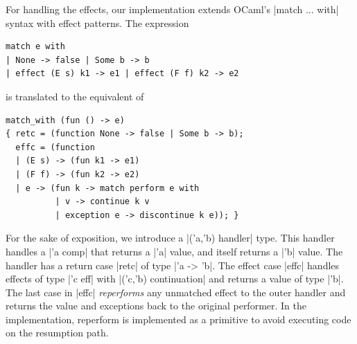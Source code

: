 \documentclass[sigplan,10pt,review,anonymous]{acmart}\settopmatter{printfolios=true,printccs=false,printacmref=false}
\begin{document}
For handling the effects, our implementation extends OCaml's |match ... with|
syntax with effect patterns. The expression
\begin{lstlisting}
match e with
| None -> false | Some b -> b
| effect (E s) k1 -> e1 | effect (F f) k2 -> e2
\end{lstlisting}
\noindent is translated to the equivalent of
\begin{lstlisting}
match_with (fun () -> e)
{ retc = (function None -> false | Some b -> b);
  effc = (function
  | (E s) -> (fun k1 -> e1)
  | (F f) -> (fun k2 -> e2)
  | e -> (fun k -> match perform e with
          | v -> continue k v
          | exception e -> discontinue k e)); }
\end{lstlisting}
For the sake of exposition, we introduce a |('a,'b) handler| type. This handler
handles a |'a comp| that returns a |'a| value, and itself returns a |'b| value.
The handler has a return case |retc| of type |'a -> 'b|. The effect case |effc|
handles effects of type |'c eff| with |('c,'b) continuation| and returns a
value of type |'b|. The last case in |effc| \emph{reperforms} any unmatched
effect to the outer handler and returns the value and exceptions back to the
original performer. In the implementation, reperform is implemented as a
primitive to avoid executing code on the resumption path.
\end{document}
